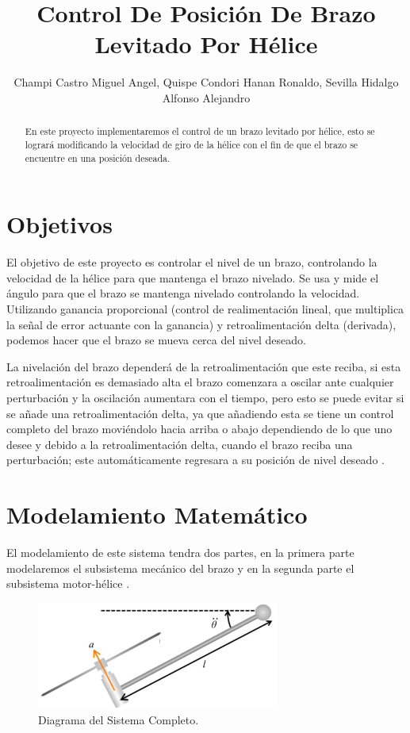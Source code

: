 \documentclass[a4paper]{IEEEtran} %
\begin{document}
\title{Control De Posición De Brazo Levitado Por Hélice}
\author{Champi Castro Miguel Angel, Quispe Condori Hanan Ronaldo, Sevilla Hidalgo Alfonso Alejandro}
\maketitle
\begin{abstract}
En este proyecto implementaremos el control de un brazo levitado por hélice, esto se logrará modificando la velocidad de giro de la hélice con el fin de que el brazo se encuentre en una posición deseada.
\end{abstract}
\section{Objetivos}
El objetivo de este proyecto es controlar el nivel de un brazo, controlando la velocidad de la hélice para que mantenga el brazo nivelado. Se usa y mide el ángulo para que el brazo se mantenga nivelado controlando la velocidad. Utilizando ganancia proporcional (control de realimentación lineal, que multiplica la señal de error actuante con la ganancia) y retroalimentación delta (derivada), podemos hacer que el brazo se mueva cerca del nivel deseado.

La nivelación del brazo dependerá de la retroalimentación que este reciba, si esta retroalimentación es demasiado alta el brazo comenzara a oscilar ante cualquier perturbación y la oscilación aumentara con el tiempo, pero esto se puede evitar si se añade una retroalimentación delta, ya que añadiendo esta se tiene un control completo del brazo moviéndolo hacia arriba o abajo dependiendo de lo que uno desee y debido a la retroalimentación delta, cuando el brazo reciba una perturbación; este automáticamente regresara a su posición de nivel deseado \cite{edxpage}.

\section{Modelamiento Matemático}
\label{sec:modelamiento}
El modelamiento de este sistema tendra dos partes, en la primera parte modelaremos el subsistema mecánico del brazo y en la segunda parte el subsistema motor-hélice \cite{gunel2016modeling}.
\begin{figure}[h]
    \centering
        \includegraphics[width=8cm]{images/1}
        \caption{Diagrama del Sistema Completo.}
        \label{fig:DLC}
\end{figure}
\end{document}
